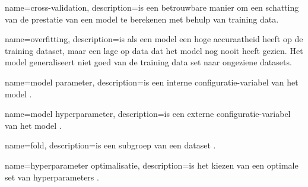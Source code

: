 {
    name=cross-validation,
    description={is een betrouwbare manier om een schatting van de prestatie van een model te berekenen met behulp van training data.}
}

{
    name=overfitting,
    description={is als een model een hoge accuraatheid heeft op de training dataset, maar een lage op data dat het model nog nooit heeft gezien. Het model generaliseert niet goed van de training data set naar ongeziene datasets.}
}

{
    name=model parameter,
    description={is een interne configuratie-variabel van het model \cite{ml-model-hyper-parameter-brownlee}.}
}

{
    name=model hyperparameter,
    description={is een externe configuratie-variabel van het model \cite{ml-model-hyper-parameter-brownlee}.}
}

{
    name=fold,
    description={is een subgroep van een dataset \cite{data-science-primer}.}
}

{
    name=hyperparameter optimalisatie,
    description={is het kiezen van een optimale set van hyperparameters \cite{hyperparameter-optimization-wikipedia}.}
}

